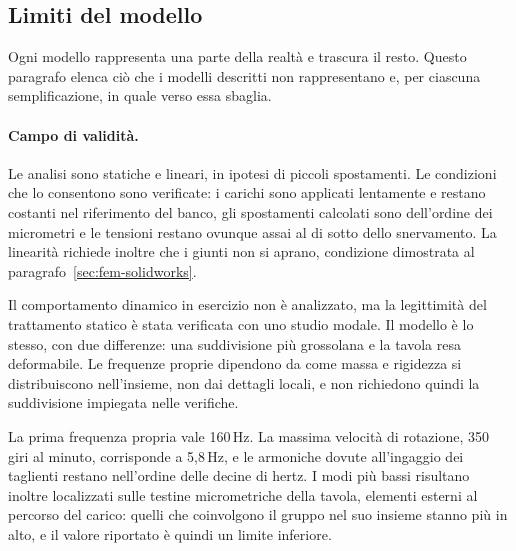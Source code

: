 
\subsection{Limiti del modello}
\label{sec:fem-limiti}

Ogni modello rappresenta una parte della realtà e trascura il resto. Questo
paragrafo elenca ciò che i modelli descritti non rappresentano e, per ciascuna
semplificazione, in quale verso essa sbaglia.

\paragraph{Campo di validità.}
Le analisi sono statiche e lineari, in ipotesi di piccoli spostamenti. Le
condizioni che lo consentono sono verificate: i carichi sono applicati
lentamente e restano costanti nel riferimento del banco, gli spostamenti
calcolati sono dell'ordine dei micrometri e le tensioni restano ovunque assai al
di sotto dello snervamento. La linearità richiede inoltre che i giunti non si
aprano, condizione dimostrata al paragrafo~\ref{sec:fem-solidworks}.

Il comportamento dinamico in esercizio non è analizzato, ma la legittimità del
trattamento statico è stata verificata con uno studio modale. Il modello è lo
stesso, con due differenze: una suddivisione più grossolana e la tavola resa
deformabile. Le frequenze proprie dipendono da come massa e rigidezza si
distribuiscono nell'insieme, non dai dettagli locali, e non richiedono quindi la
suddivisione impiegata nelle verifiche.

La prima frequenza propria vale 160\,Hz. La massima velocità di rotazione, 350
giri al minuto, corrisponde a 5,8\,Hz, e le armoniche dovute all'ingaggio dei
taglienti restano nell'ordine delle decine di hertz. I modi più bassi risultano
inoltre localizzati sulle testine micrometriche della tavola, elementi esterni
al percorso del carico: quelli che coinvolgono il gruppo nel suo insieme stanno
più in alto, e il valore riportato è quindi un limite inferiore.

